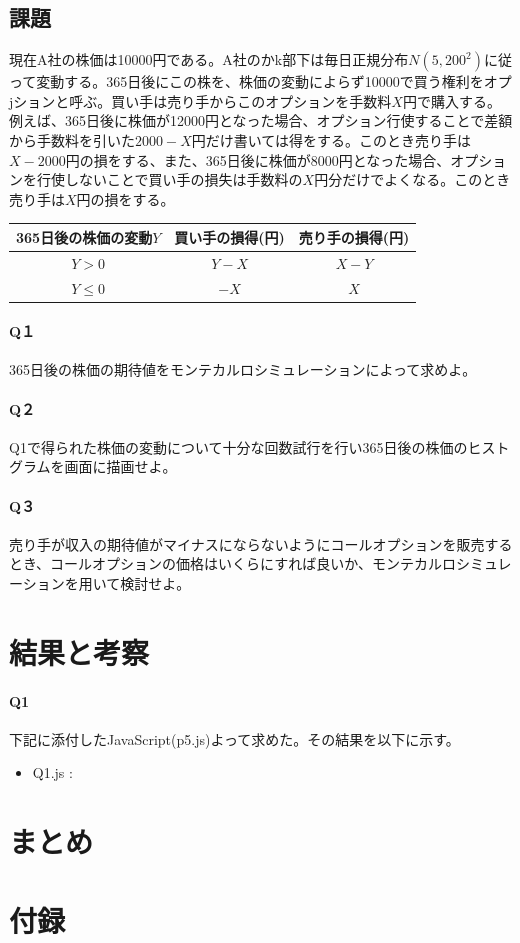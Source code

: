 \documentclass[dvipdfmx]{jsarticle}
\begin{document}
\subsection{課題}
現在A社の株価は10000円である。A社のかk部下は毎日正規分布$N(5, 200^{2})$に従って変動する。365日後にこの株を、株価の変動によらず10000で買う権利をオプjションと呼ぶ。買い手は売り手からこのオプションを手数料$X$円で購入する。例えば、365日後に株価が12000円となった場合、オプション行使することで差額から手数料を引いた$2000-X$円だけ書いては得をする。このとき売り手は$X-2000$円の損をする、また、365日後に株価が8000円となった場合、オプションを行使しないことで買い手の損失は手数料の$X$円分だけでよくなる。このとき売り手は$X$円の損をする。
\begin{table}[H]
  \begin{center}
    \begin{tabular}{|c|c|c|} \hline
      365日後の株価の変動$Y$ & 買い手の損得(円) & 売り手の損得(円) \\ \hline
      $Y > 0$ & $Y - X$ & $X - Y$ \\
      $Y \leq 0$ & $-X$ & $X$ \\ \hline
    \end{tabular}
    \label{hyo02}
  \end{center}
\end{table}
\paragraph{Q１}365日後の株価の期待値をモンテカルロシミュレーションによって求めよ。
\paragraph{Q２}Q1で得られた株価の変動について十分な回数試行を行い365日後の株価のヒストグラムを画面に描画せよ。
\paragraph{Q３}売り手が収入の期待値がマイナスにならないようにコールオプションを販売するとき、コールオプションの価格はいくらにすれば良いか、モンテカルロシミュレーションを用いて検討せよ。
\section{結果と考察}
\paragraph{Q1}
下記に添付したJavaScript(p5.js)よって求めた。その結果を以下に示す。
\begin{itemize}
  \item Q1.js : \url{}
\end{itemize}
\section{まとめ}
\section{付録}
\end{document}
